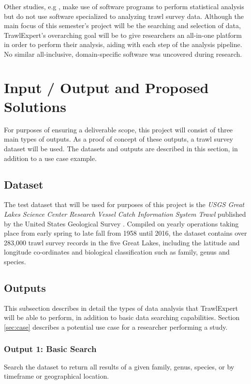 \documentclass{article}
\begin{document}
Other studies, e.g \cite{swartzman1992spatial}, make use of software programs to perform statistical analysis but do not use software specialized to analyzing trawl survey data. Although the main focus of this semester's project will be the searching and selection of data, TrawlExpert's overarching goal will be to give researchers an all-in-one platform in order to perform their analysis, aiding with each step of the analysis pipeline. No similar all-inclusive, domain-specific software was uncovered during research.

\section{Input / Output and Proposed Solutions}
For purposes of ensuring a deliverable scope, this project will consist of three main types of outputs. As a proof of concept of these outputs, a trawl survey dataset will be used. The datasets and outputs are described in this section, in addition to a use case example.

\subsection{Dataset}\label{sec:out}
The test dataset that will be used for purposes of this project is the \textit{USGS Great Lakes Science Center Research Vessel Catch Information System Trawl} published by the United States Geological Survey \citep{usgs2018}. Compiled on yearly operations taking place from early spring to late fall from 1958 until 2016, the dataset contains over 283,000 trawl survey records in the five Great Lakes, including the latitude and longitude co-ordinates and biological classification such as family, genus and species.

\subsection{Outputs}
This subsection describes in detail the types of data analysis that TrawlExpert will be able to perform, in addition to basic data searching capabilities. Section \ref{sec:case} describes a potential use case for a researcher performing a study.

\subsubsection{Output 1: Basic Search}
Search the dataset to return all results of a given family, genus, species, or by timeframe or geographical location.
\end{document}
